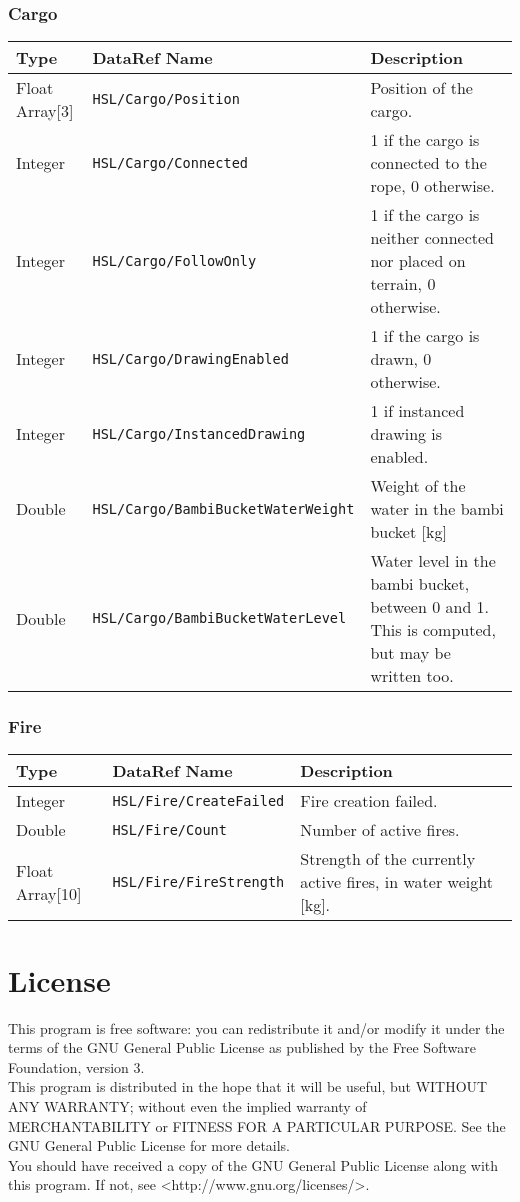 \documentclass[10pt,a4]{scrartcl}
\begin{document}
\subsubsection{Cargo}
\begin{tabularx}{\linewidth}{| l | l | X |} \hline
\textbf{Type} & \textbf{DataRef Name}& \textbf{Description}\\ \hline
Float Array[3] & \texttt{HSL/Cargo/Position} & Position of the cargo.\\ \hline
Integer & \texttt{HSL/Cargo/Connected} & 1 if the cargo is connected to the rope, 0 otherwise.\\ \hline
Integer & \texttt{HSL/Cargo/FollowOnly} &  1 if the cargo is neither connected nor placed on terrain, 0 otherwise.\\ \hline
Integer & \texttt{HSL/Cargo/DrawingEnabled} & 1 if the cargo is drawn, 0 otherwise.\\ \hline
Integer & \texttt{HSL/Cargo/InstancedDrawing} & 1 if instanced drawing is enabled.\\ \hline
Double & \texttt{HSL/Cargo/BambiBucketWaterWeight} & Weight of the water in the bambi bucket [kg]\\ \hline
Double & \texttt{HSL/Cargo/BambiBucketWaterLevel} & Water level in the bambi bucket, between 0 and 1. This is computed, but may be written too.\\ \hline
\end{tabularx}

\subsubsection{Fire}
\begin{tabularx}{\linewidth}{| l | l | X |} \hline
\textbf{Type} & \textbf{DataRef Name}& \textbf{Description}\\ \hline
Integer & \texttt{HSL/Fire/CreateFailed} & Fire creation failed.\\ \hline
Double & \texttt{HSL/Fire/Count} & Number of active fires.\\ \hline
Float Array[10] & \texttt{HSL/Fire/FireStrength} & Strength of the currently active fires, in water weight [kg].\\ \hline
\end{tabularx}

\section{License}
This program is free software: you can redistribute it and/or modify it under the terms of the GNU General Public License as published by the Free Software Foundation, version 3.\\

This program is distributed in the hope that it will be useful, but WITHOUT ANY WARRANTY; without even the implied warranty of MERCHANTABILITY or FITNESS FOR A PARTICULAR PURPOSE. See the GNU General Public License for more details.\\

You should have received a copy of the GNU General Public License along with this program. If not, see <http://www.gnu.org/licenses/>.\\
\end{document}

